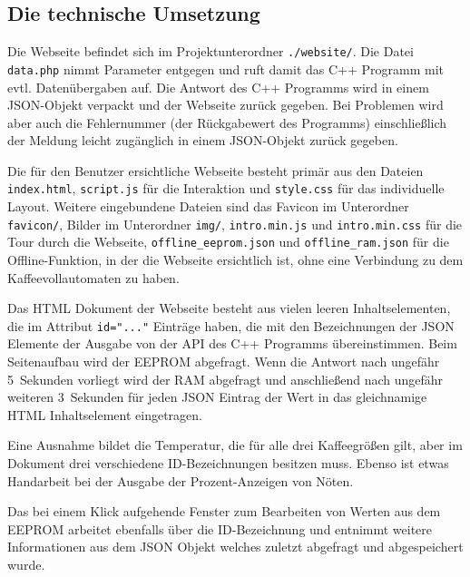 \subsection{Die technische Umsetzung}
Die Webseite befindet sich im Projektunterordner \texttt{./website/}.
Die Datei \texttt{data.php} nimmt Parameter entgegen und ruft damit das C++ Programm mit evtl. Datenübergaben auf.
Die Antwort des C++ Programms wird in einem \ac{JSON}-Objekt verpackt und der Webseite zurück gegeben.
Bei Problemen wird aber auch die Fehlernummer (der Rückgabewert des Programms) einschließlich der Meldung leicht zugänglich in einem \ac{JSON}-Objekt zurück gegeben.

Die für den Benutzer ersichtliche Webseite besteht primär aus den Dateien \texttt{index.html}, \texttt{script.js} für die Interaktion und \texttt{style.css} für das individuelle Layout.
Weitere eingebundene Dateien sind das Favicon im Unterordner \texttt{favicon/}, Bilder im Unterordner \texttt{img/}, \texttt{intro.min.js} und \texttt{intro.min.css} für die Tour durch die Webseite, \texttt{offline\_eeprom.json} und \texttt{offline\_ram.json} für die Offline-Funktion, in der die Webseite ersichtlich ist, ohne eine Verbindung zu dem Kaffeevollautomaten zu haben.

Das \ac{HTML} Dokument der Webseite besteht aus vielen leeren Inhaltselementen, die im Attribut \texttt{id="..."} Einträge haben, die mit den Bezeichnungen der \ac{JSON} Elemente der Ausgabe von der API des C++ Programms übereinstimmen.
Beim Seitenaufbau wird der \ac{EEPROM} abgefragt.
Wenn die Antwort nach ungefähr 5~Sekunden vorliegt wird der \ac{RAM} abgefragt und anschließend nach ungefähr weiteren 3~Sekunden für jeden \ac{JSON} Eintrag der Wert in das gleichnamige \ac{HTML} Inhaltselement eingetragen.

Eine Ausnahme bildet die Temperatur, die für alle drei Kaffeegrößen gilt, aber im Dokument drei verschiedene ID-Bezeichnungen besitzen muss.
Ebenso ist etwas Handarbeit bei der Ausgabe der Prozent-Anzeigen von Nöten.

Das bei einem Klick aufgehende Fenster zum Bearbeiten von Werten aus dem \ac{EEPROM} arbeitet ebenfalls über die ID-Bezeichnung und entnimmt weitere Informationen aus dem \ac{JSON} Objekt welches zuletzt abgefragt und abgespeichert wurde.
